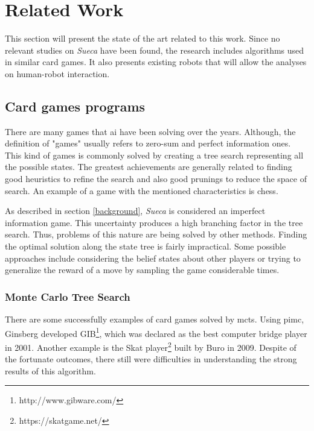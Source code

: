 \section{Related Work} \label{relatedwork}

This section will present the state of the art related to this work. Since no relevant studies on \emph{Sueca} have been found, the research includes algorithms used in similar card games. It also presents existing robots that will allow the analyses on human-robot interaction.


\subsection{Card games programs}
 
There are many games that \gls{ai} have been solving over the years. Although, the definition of "games" usually refers to zero-sum and perfect information ones. This kind of games is commonly solved by creating a tree search representing all the possible states. The greatest achievements are generally related to finding good heuristics to refine the search and also good prunings to reduce the space of search. An example of a game with the mentioned characteristics is chess.

As described in section \ref{background}, \emph{Sueca} is considered an imperfect information game. This uncertainty produces a high branching factor in the tree search. Thus, problems of this nature are being solved by other methods. Finding the optimal solution along the state tree is fairly impractical. Some possible approaches include considering the belief states about other players or trying to generalize the reward of a move by sampling the game considerable times.


\subsubsection{Monte Carlo Tree Search}

There are some successfully examples of card games solved by \gls{mcts}. Using \gls{pimc}, Ginsberg developed GIB\footnote{http://www.gibware.com/}, which was declared as the best computer bridge player in 2001. Another example is the Skat player\footnote{https://skatgame.net/} built by Buro in 2009.
Despite of the fortunate outcomes, there still were difficulties in understanding the strong results of this algorithm.

